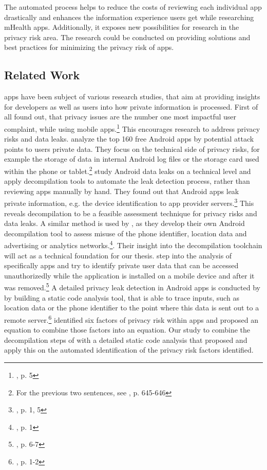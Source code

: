 \documentclass[
	a4paper,
	oneside,
	12pt,
	liststotocnumbered
]{article}
\let\cite\textcite
\begin{document}
The automated process helps to reduce the costs of reviewing each individual app drastically and enhances the information experience users get while researching mHealth apps.
Additionally, it exposes new possibilities for research in the privacy risk area. The research could be conducted on providing solutions and best practices for minimizing the privacy risk of apps.

\subsection{Related Work}
\mH apps have been subject of various research studies, that aim at providing insights for developers as well as users into how private information is processed.
First of all \cite{Khalid2015} found out, that privacy issues are the number one most impactful user complaint, while using mobile apps.\footnote{\cite{Khalid2015}, p. 5}
This encourages research to address privacy risks and data leaks.
\cite{He2014} analyze the top 160 free Android \mH apps by potential attack points to users private data. They focus on the technical side of privacy risks, for example the storage of \mH data in internal Android log files or the storage card used within the phone or tablet.\footnote{For the previous two sentences, see \cite{He2014}, p. 645-646}
\cite{Mcclurg2012} study Android data leaks on a technical level and apply decompilation tools to automate the leak detection process, rather than reviewing apps manually by hand. They found out that Android apps leak private information, e.g. the device identification to app provider servers.\footnote{\cite{Mcclurg2012}, p. 1, 5}
This reveals decompilation to be a feasible assessment technique for privacy risks and data leaks.
A similar method is used by \cite{Enck2011}, as they develop their own Android decompilation tool to assess misuse of the phone identifier, location data and advertising or analytics networks.\footnote{\cite{Enck2011}, p. 1}.
Their insight into the decompilation toolchain will act as a technical foundation for our thesis.
\cite{Mitchell2013} step into the analysis of specifically \mH apps and try to identify private user data that can be accessed unauthorizedly while the application is installed on a mobile device and after it was removed.\footnote{\cite{Mitchell2013}, p. 6-7}
A detailed privacy leak detection in Android apps is conducted by \cite{Kim2012} by building a static code analysis tool, that is able to trace inputs, such as location data or the phone identifier to the point where this data is sent out to a remote server.\footnote{\cite{Kim2012}, p. 1-2}
\cite{Bruggemann2016} identified six factors of privacy risk within \mH apps and proposed an equation to combine those factors into an equation.
Our study to combine the decompilation steps of \cite{Enck2011} with a detailed static code analysis that \cite{Kim2012} proposed and apply this on the automated identification of the privacy risk factors \cite{Bruggemann2016} identified.
\end{document}
